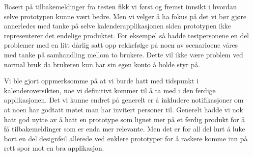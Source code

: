 Basert på tilbakemeldinger  fra testen fikk vi først og fremst innsikt i hvordan selve prototypen kunne vært bedre. Men vi velger å ha fokus på det vi bør gjøre annerledes med tanke på selve kalenderapplikasjonen siden prototypen ikke representerer det endelige produktet. For eksempel så hadde testpersonene en del problemer med en litt dårlig satt opp rekkefølge på noen av scenarioene våres med tanke på samhandling mellom to brukere. Dette vil ikke være problem ved normal bruk da brukeren kun har sin egen konto å holde styr på.

Vi ble gjort oppmerksomme på at vi burde hatt med tidspunkt i kalenderoversikten, noe vi definitivt kommer til å ta med i den ferdige applikasjonen. Det vi kunne endret på generelt er å inkludere notifikasjoner om at noen har godtatt møtet man har invitert personer til. 
Generelt hadde vi nok hatt god nytte av å hatt en prototype som lignet mer på et ferdig produkt for å få tilbakemeldinger som er enda mer relevante. Men det er for all del lurt å luke bort en del designfeil allerede ved enklere prototyper for å raskere komme inn på rett spor mot en bra applikasjon. 